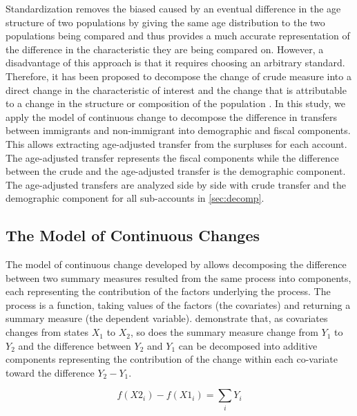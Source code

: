 \vspace{0.7em}\par
Standardization removes the biased caused by an eventual difference in the age structure of two populations by giving the same age distribution to the two populations being compared and thus provides a much accurate representation of the difference in the characteristic they are being compared on.
However, a disadvantage of this approach is that it requires choosing an arbitrary standard.
Therefore, it has been proposed to decompose the change of crude measure into a direct change in the characteristic of interest and the change that is attributable to a change in the structure or composition of the population \citep{Prskawetz:2005dx}.
In this study, we apply the model of continuous change \citep{Horiuchi:2008cn} to decompose the difference in transfers between immigrants and non-immigrant into demographic and fiscal components.
This allows extracting age-adjusted transfer from the surpluses for each account.
The age-adjusted transfer represents the fiscal components while the difference between the crude and the age-adjusted transfer is the demographic component.
The age-adjusted transfers are analyzed side by side with crude transfer and the demographic component for all sub-accounts in \autoref{sec:decomp}.

\subsection{The Model of Continuous Changes}\label{sec:model}

The model of continuous change developed by \citet{Horiuchi:2008cn} allows decomposing the difference between two summary measures resulted from the same process into components, each representing the contribution of the factors underlying the process.
The process is a function, taking values of the factors (the covariates) and returning a summary measure (the dependent variable). \citet{Horiuchi:2008cn} demonstrate that, as covariates changes from states \( X_1 \) to \( X_2 \),  so does the summary measure change from \( Y_1 \) to \( Y_2 \)  and the difference between \( Y_2 \) and \( Y_1 \) can be decomposed into additive components representing the contribution of the change within each co-variate toward the difference \( Y_2 - Y_1\).

\begin{equation}\label{eq:ho}
  f(X2_{i}) - f(X1_{i}) = \displaystyle\sum_{i}Y_{i}
\end{equation}

